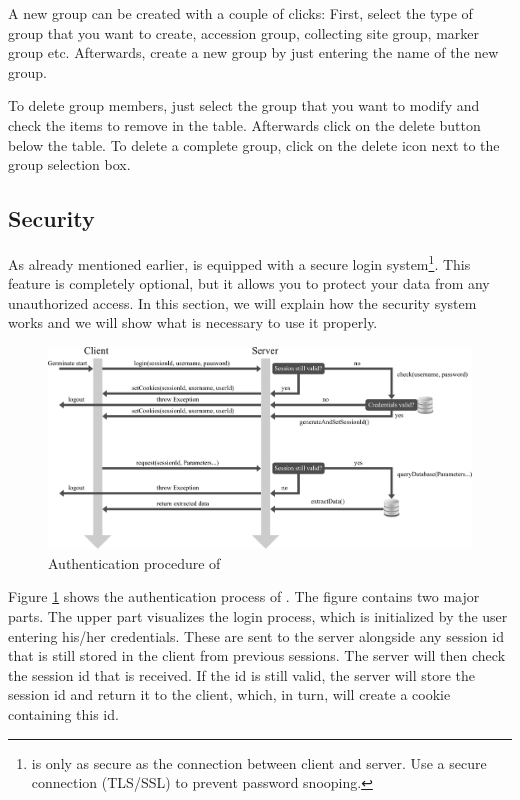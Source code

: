 A new group can be created with a couple of clicks: First, select the type of group that you want to create, \eg accession group, collecting site group, marker group etc. Afterwards, create a new group by just entering the name of the new group.

To delete group members, just select the group that you want to modify and check the items to remove in the table. Afterwards click on the delete button below the table. To delete a complete group, click on the delete icon next to the group selection box.

\subsection{Security}
\label{sec:example_security}
As already mentioned earlier, {\germinate} is equipped with a secure login system\footnote{{\germinate} is only as secure as the connection between client and server. Use a secure connection (TLS/SSL) to prevent password snooping.}. This feature is completely optional, but it allows you to protect your data from any unauthorized access. In this section, we will explain how the security system works and we will show what is necessary to use it properly.

\begin{figure}[h]
    \centering
    \includegraphics[scale=0.5]{img/examples/authentication.pdf}
    \caption{Authentication procedure of {\germinate}}
    \label{fig:authentication}
\end{figure}

Figure \ref{fig:authentication} shows the authentication process of {\germinate}. The figure contains two major parts. The upper part visualizes the login process, which is initialized by the user entering his/her credentials. These are sent to the server alongside any session id that is still stored in the client from previous sessions. The server will then check the session id that is received. If the id is still valid, the server will store the session id and return it to the client, which, in turn, will create a cookie containing this id.

